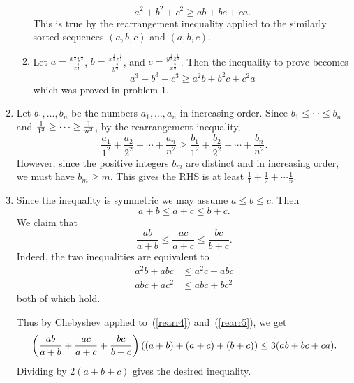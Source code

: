\begin{enumerate}
\begin{enumerate}
\[
a^2+b^2+c^2\ge ab+bc+ca.
\]
This is true by the rearrangement inequality applied to the similarly sorted sequences $(a,b,c)$ and $(a,b,c)$.
\item
Let $a=\frac{x^{\frac 13}y^{\frac 13}}{z^{\frac 23}}$, $b=\frac{x^{\frac 13}z^{\frac 13}}{y^{\frac 23}}$, and $c=\frac{y^{\frac 13}z^{\frac 13}}{x^{\frac 23}}$. Then the inequality to prove becomes
\[
a^3+b^3+c^3\ge a^2b+b^2c+c^2a
\]
which was proved in problem 1.
\end{enumerate}
\item
Let $b_1,\ldots, b_n$ be the numbers $a_1,\ldots, a_n$ in increasing order. Since $b_1\le \cdots \le b_n$ and $\frac{1}{1^2}\ge \cdots \ge \frac{1}{n^2}$, by the rearrangement inequality,
\[
\frac{a_1}{1^2}+\frac{a_2}{2^2}+\cdots +\frac{a_n}{n^2}\ge \frac{b_1}{1^2}+\frac{b_2}{2^2}+\cdots +\frac{b_n}{n^2}.
\]
However, since the positive integers $b_m$ are distinct and in increasing order, we must have $b_m\ge m$. This gives the RHS is at least $\frac 11+\frac 12+\cdots \frac 1n$.
\item
Since the inequality is symmetric we may assume $a\le b\le c$. Then \begin{equation}\label{rearr4}
a+b\le a+c\le b+c.\end{equation}
We claim that
\begin{equation}\label{rearr5}
\frac{ab}{a+b}\le \frac{ac}{a+c}\le \frac{bc}{b+c}.
\end{equation}
Indeed, the two inequalities are equivalent to
\begin{align*}
a^2b+abc&\le a^2c+abc\\
abc+ac^2&\le abc+bc^2
\end{align*}
both of which hold.

Thus by Chebyshev applied to~(\ref{rearr4}) and~(\ref{rearr5}), we get
\begin{equation}\label{rearr6}
\left( {\frac{ab}{a+b}+ \frac{ac}{a+c}+ \frac{bc}{b+c}} \right)((a+b)+(a+c)+(b+c))\le 3(ab+bc+ca).
\end{equation}
Dividing by $2(a+b+c)$ gives the desired inequality.


\end{enumerate}

